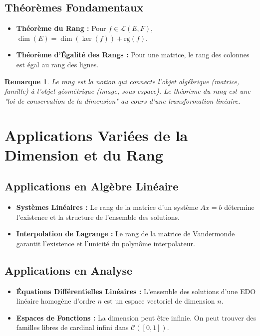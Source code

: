 \documentclass[12pt, a4paper, parskip=full]{report}
\theoremstyle{agregstyle}
\newtheorem{remark}[definition]{Remarque}
\begin{document}
\subsection{Théorèmes Fondamentaux}
\begin{itemize}
    \item \textbf{Théorème du Rang :} Pour $f \in \mathcal{L}(E,F)$, $\dim(E) = \dim(\ker(f)) + \mathrm{rg}(f)$.
    \item \textbf{Théorème d'Égalité des Rangs :} Pour une matrice, le rang des colonnes est égal au rang des lignes.
\end{itemize}
\begin{remark}
    Le rang est la notion qui connecte l'objet algébrique (matrice, famille) à l'objet géométrique (image, sous-espace). Le théorème du rang est une "loi de conservation de la dimension" au cours d'une transformation linéaire.
\end{remark}

\section{Applications Variées de la Dimension et du Rang}
\subsection{Applications en Algèbre Linéaire}
\begin{itemize}
    \item \textbf{Systèmes Linéaires :} Le rang de la matrice d'un système $Ax=b$ détermine l'existence et la structure de l'ensemble des solutions.
    \item \textbf{Interpolation de Lagrange :} Le rang de la matrice de Vandermonde garantit l'existence et l'unicité du polynôme interpolateur.
\end{itemize}
\subsection{Applications en Analyse}
\begin{itemize}
    \item \textbf{Équations Différentielles Linéaires :} L'ensemble des solutions d'une EDO linéaire homogène d'ordre $n$ est un espace vectoriel de dimension $n$.
    \item \textbf{Espaces de Fonctions :} La dimension peut être infinie. On peut trouver des familles libres de cardinal infini dans $\mathcal{C}([0,1])$.
\end{itemize}
\end{document}
